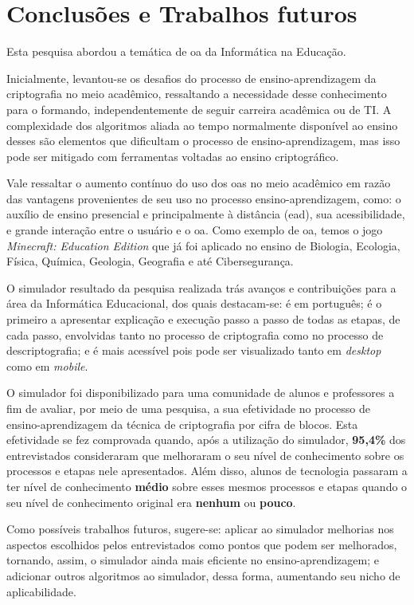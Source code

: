 \chapter{Conclusões e Trabalhos futuros}
\label{char:conclusoesetrabfuturos}
Esta pesquisa abordou a temática de \acrfull{oa} da Informática na Educação.

Inicialmente, levantou-se os desafios do processo de ensino-aprendizagem da criptografia no meio acadêmico, ressaltando a necessidade desse conhecimento para o formando, independentemente de seguir carreira acadêmica ou de TI. A complexidade dos algoritmos aliada ao tempo normalmente disponível ao ensino desses são elementos que dificultam o processo de ensino-aprendizagem, mas isso pode ser mitigado com ferramentas voltadas ao ensino criptográfico.

Vale ressaltar o aumento contínuo do uso dos \acrshort{oas} no meio acadêmico em razão das vantagens provenientes de seu uso no processo ensino-aprendizagem, como: o auxílio de ensino presencial e principalmente à distância (\acrshort{ead}), sua acessibilidade, e grande interação entre o usuário e o \acrshort{oa}. Como exemplo de \acrshort{oa}, temos o jogo \textit{Minecraft: Education Edition} que já foi aplicado no ensino de Biologia, Ecologia, Física, Química, Geologia, Geografia e até Cibersegurança.

O simulador resultado da pesquisa realizada trás avanços e contribuições para a área da Informática Educacional, dos quais destacam-se: é em português; é o primeiro a apresentar explicação e execução passo a passo de todas as etapas, de cada passo, envolvidas tanto no processo de criptografia como no processo de descriptografia; e é mais acessível pois pode ser visualizado tanto em \textit{desktop} como em \textit{mobile}.

O simulador foi disponibilizado para uma comunidade de alunos e professores a fim de avaliar, por meio de uma pesquisa, a sua efetividade no processo de ensino-aprendizagem da técnica de criptografia por cifra de blocos. Esta efetividade se fez comprovada quando, após a utilização do simulador, \textbf{95,4\%} dos entrevistados consideraram que melhoraram o seu nível de conhecimento sobre os processos e etapas nele apresentados. Além disso, alunos de tecnologia passaram a ter nível de conhecimento \textbf{médio} sobre esses mesmos processos e etapas quando o seu nível de conhecimento original era \textbf{nenhum} ou \textbf{pouco}.

Como possíveis trabalhos futuros, sugere-se: aplicar ao simulador melhorias nos aspectos escolhidos pelos entrevistados como pontos que podem ser melhorados, tornando, assim, o simulador ainda mais eficiente no ensino-aprendizagem; e adicionar outros algoritmos ao simulador, dessa forma, aumentando seu nicho de aplicabilidade.
